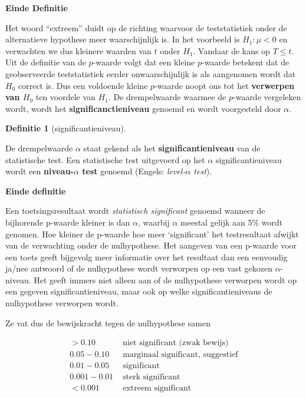 \documentclass[
  12pt,dutch,coursenotes]{book}
\theoremstyle{definition}
\newtheorem{definition}{Definitie}[chapter]
\theoremstyle{definition}
\theoremstyle{definition}
\theoremstyle{remark}
\begin{document}
\textbf{Einde Definitie}

Het woord ``extreem'' duidt op de richting waarvoor de teststatistiek onder de alternatieve hypothese meer waarschijnlijk is. In het voorbeeld is \(H_1: \mu < 0\) en verwachten we dus kleinere waarden van \(t\) onder \(H_1\). Vandaar de kans op \(T\leq t\).
Uit de definitie van de \(p\)-waarde volgt dat een kleine \(p\)-waarde betekent dat de geobserveerde teststatistiek eerder onwaarschijnlijk is als aangenomen wordt dat \(H_0\) correct is.
Dus een voldoende kleine \(p\)-waarde noopt ons tot het \textbf{verwerpen van \(H_0\)} ten voordele van \(H_1\).
De drempelwaarde waarmee de \(p\)-waarde vergeleken wordt, wordt het \textbf{significanctieniveau} genoemd en wordt voorgesteld door \(\alpha\).

\begin{definition}[significantieniveau]
\protect\hypertarget{def:unnamed-chunk-164}{}{\label{def:unnamed-chunk-164} \iffalse (significantieniveau) \fi{} }
\end{definition}
De drempelwaarde \(\alpha\) staat gekend als het \textbf{significantieniveau} van de statistische test. Een statistische test uitgevoerd op het \(\alpha\) significantieniveau wordt een \textbf{niveau-\(\alpha\) test} genoemd (Engels: \emph{level-\(\alpha\) test}).

\textbf{Einde definitie}

Een toetsingsresultaat wordt \emph{statistisch significant} genoemd
wanneer de bijhorende p-waarde kleiner is dan \(\alpha\), waarbij \(\alpha\)
meestal gelijk aan 5\% wordt genomen. Hoe kleiner de p-waarde hoe meer
`significant' het testresultaat afwijkt van de verwachting onder de
nulhypothese. Het aangeven van een p-waarde voor een toets geeft bijgevolg
meer informatie over het resultaat dan een eenvoudig ja/nee antwoord of de
nulhypothese wordt verworpen op een vast gekozen \(\alpha\)-niveau. Het geeft immers niet alleen aan of de nulhypothese verworpen wordt op een gegeven significantieniveau, maar ook op welke significantieniveaus de nulhypothese verworpen wordt.

Ze vat dus de bewijskracht tegen de nulhypothese samen

\[\begin{array}{cl}>0.10 & \text{ niet significant (zwak bewijs)}\\0.05-0.10 & \text{ marginaal significant, suggestief}\\0.01-0.05 & \text{ significant}\\0.001-0.01 & \text{ sterk significant}\\<0.001 & \text{ extreem significant}\end{array}\]
\end{document}
